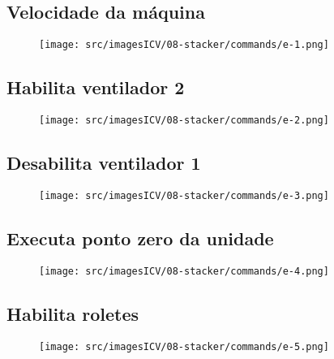 \thispagestyle{fancy}
\vspace{\fill}
\subsection{\small Velocidade da máquina}
\begin{figure}
    \centering
    \texttt{[image: src/imagesICV/08-stacker/commands/e-1.png]}
\end{figure}

\newpage
\thispagestyle{fancy}
\vspace{\fill}
\subsection{\small Habilita ventilador 2}
\begin{figure}
    \centering
    \texttt{[image: src/imagesICV/08-stacker/commands/e-2.png]}
\end{figure}

\newpage
\thispagestyle{fancy}
\vspace{\fill}
\subsection{\small Desabilita ventilador 1}
\begin{figure}
    \centering
    \texttt{[image: src/imagesICV/08-stacker/commands/e-3.png]}
\end{figure}

\newpage
\thispagestyle{fancy}
\vspace{\fill}
\subsection{\small Executa ponto zero da unidade}
\begin{figure}
    \centering
    \texttt{[image: src/imagesICV/08-stacker/commands/e-4.png]}
\end{figure}

\newpage
\thispagestyle{fancy}
\vspace{\fill}
\subsection{\small Habilita roletes}
\begin{figure}
    \centering
    \texttt{[image: src/imagesICV/08-stacker/commands/e-5.png]}
\end{figure}

